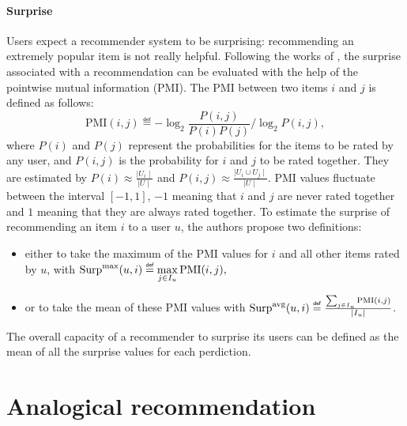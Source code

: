 \paragraph{Surprise\\}
Users expect a recommender system to be surprising: recommending an extremely
popular item is not really helpful. Following the works of
\cite{KamBriRecSys2014}, the surprise associated with a recommendation can be evaluated with
the help of the pointwise mutual information (PMI). The PMI between two items
$i$ and $j$ is defined as follows:
$$\text{PMI}(i, j) \eqdef -\log_2 \frac{P(i, j)}{P(i)P(j)} / \log_2 P(i, j),$$
where $P(i)$ and $P(j)$  represent the probabilities for the items to be rated
by any user, and $P(i, j)$ is the probability for $i$ and $j$ to be rated
together. They are estimated by $P(i) \approx \frac{\mid U_i \mid}{\mid U
\mid}$ and $P(i, j) \approx \frac{\mid U_i \cup U_j \mid}{\mid U\mid}$. PMI
values fluctuate between the interval $[-1, 1]$, $-1$ meaning that $i$ and $j$
are never rated together and $1$ meaning that they are always rated together.
To estimate the surprise of recommending an item $i$ to a user $u$, the authors
propose two definitions:
\begin{itemize}
\item either to take the maximum of the PMI values for $i$ and all other items
  rated by $u$, with $\surpmax(u, i) \eqdef \max\limits_{j\in I_u}
    \text{PMI}(i, j),$
\item
 or to take the mean of these PMI values with $\surpavg(u, i) \eqdef
    \frac{\sum_{j \in I_u} \text{PMI}(i, j)}{\mid I_u\mid }$.
\end{itemize}

The overall capacity of a recommender to surprise its users can be defined as
the mean of all the surprise values for each perdiction.

\section{Analogical recommendation}
\label{sec:analogical_recommendation}

